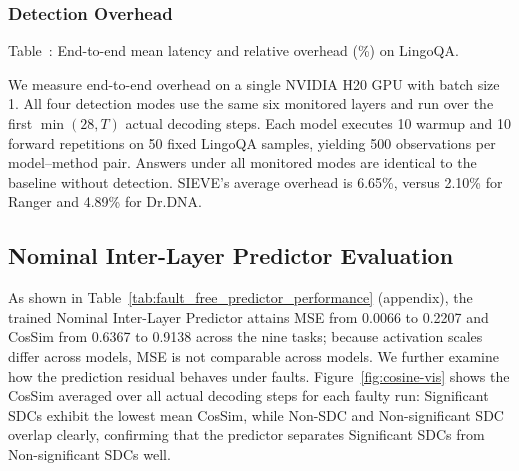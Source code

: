 \subsubsection{Detection Overhead}
\begin{table}
  \vspace{-12pt}
  {\raggedright Table~\thetable: End-to-end mean latency and relative overhead (\%) on LingoQA.\par}
  \label{tab:sieve_online_overhead}
  \vspace{2pt}
  \small
\end{table}
We measure end-to-end overhead on a single NVIDIA H20 GPU with batch size 1. All four detection modes use the same six monitored layers and run over the first $\min(28,T)$ actual decoding steps. Each model executes 10 warmup and 10 forward repetitions on 50 fixed LingoQA samples, yielding 500 observations per model--method pair. Answers under all monitored modes are identical to the baseline without detection. SIEVE's average overhead is 6.65\%, versus 2.10\% for Ranger and 4.89\% for Dr.DNA.

\subsection{Nominal Inter-Layer Predictor Evaluation}
As shown in Table~\ref{tab:fault_free_predictor_performance} (appendix), the trained Nominal Inter-Layer Predictor attains MSE from 0.0066 to 0.2207 and CosSim from 0.6367 to 0.9138 across the nine tasks; because activation scales differ across models, MSE is not comparable across models. We further examine how the prediction residual behaves under faults. Figure~\ref{fig:cosine-vis} shows the CosSim averaged over all actual decoding steps for each faulty run: Significant SDCs exhibit the lowest mean CosSim, while Non-SDC and Non-significant SDC overlap clearly, confirming that the predictor separates Significant SDCs from Non-significant SDCs well.


